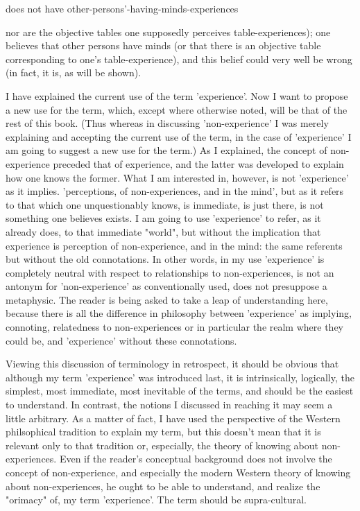 \documentclass[10pt,twoside,draft]{memoir}
\begin{document}
does not have other-persons'-having-minds-experiences {nor are the objective 
tables one supposedly perceives table-experiences); one believes that other 
persons have minds (or that there is an objective table corresponding to one's 
table-experience), and this belief could very well be wrong (in fact, it is, as 
will be shown). 

I have explained the current use of the term 'experience'. Now I want 
to propose a new use for the term, which, except where otherwise noted, 
will be that of the rest of this book. (Thus whereas in discussing 
'non-experience' I was merely explaining and accepting the current use of 
the term, in the case of 'experience' I am going to suggest a new use for the 
term.) As I explained, the concept of non-experience preceded that of 
experience, and the latter was developed to explain how one knows the 
former. What I am interested in, however, is not 'experience' as it implies. 
'perceptions, of non-experiences, and in the mind', but as it refers to that 
which one unquestionably knows, is immediate, is just there, is not 
something one believes exists. I am going to use 'experience' to refer, as it 
already does, to that immediate "world", but without the implication that 
experience is perception of non-experience, and in the mind: the same 
referents but without the old connotations. In other words, in my use 
'experience' is completely neutral with respect to relationships to 
non-experiences, is not an antonym for 'non-experience' as conventionally 
used, does not presuppose a metaphysic. The reader is being asked to take a 
leap of understanding here, because there is all the difference in philosophy 
between 'experience' as implying, connoting, relatedness to non-experiences 
or in particular the realm where they could be, and 'experience' without 
these connotations. 

Viewing this discussion of terminology in retrospect, it should be 
obvious that although my term 'experience' was introduced last, it is 
intrinsically, logically, the simplest, most immediate, most inevitable of the 
terms, and should be the easiest to understand. In contrast, the notions I 
discussed in reaching it may seem a little arbitrary. As a matter of fact, I 
have used the perspective of the Western philsophical tradition to explain my 
term, but this doesn't mean that it is relevant only to that tradition or, 
especially, the theory of knowing about non-experiences. Even if the reader's 
conceptual background does not involve the concept of non-experience, and 
especially the modern Western theory of knowing about non-experiences, he 
ought to be able to understand, and realize the "orimacy" of, my term 
'experience'. The term should be supra-cultural. 

}
\end{document}
